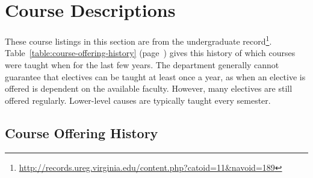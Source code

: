 \documentclass[10pt,letter,twocolumn]{book}
\newcommand{\mysection}[1]{\section{#1}\renewcommand{\rightmark}{#1}}
\newcommand{\myurl}[1]{\footnote{\scriptsize\url{#1}}}
\begin{document}

\mysection{Course Descriptions}
\label{sec:coursedesc}

These course listings in this section are from the undergraduate
record\myurl{http://records.ureg.virginia.edu/content.php?catoid=11\&navoid=189}.
Table~\ref{table:course-offering-history}
(page~\pageref{table:course-offering-history}) gives this history of
which courses were taught when for the last few years.  The department
generally cannot guarantee that electives can be taught at least once
a year, as when an elective is offered is dependent on the available
faculty.  However, many electives are still offered regularly.
Lower-level causes are typically taught every semester.

\subsection{Course Offering History}

\end{document}
